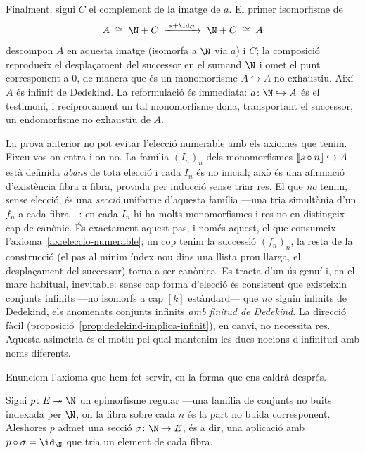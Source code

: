 \begin{prova}
Finalment, sigui \(C\) el complement de la imatge de \(a\). El primer
isomorfisme de
\[
A\;\cong\;\N + C\;\xrightarrow{\;s+\id_C\;}\;\N+C\;\cong\;A
\]
descompon \(A\) en aquesta imatge (isomorfa a \(\N\) via \(a\)) i \(C\); la
composició reprodueix el desplaçament del successor en el sumand \(\N\) i
omet el punt corresponent a \(0\), de manera que és un monomorfisme
\(A\hookrightarrow A\) no exhaustiu. Així \(A\) és infinit de Dedekind. La
reformulació és immediata: \(a\colon\N\hookrightarrow A\) és el testimoni, i
recíprocament un tal monomorfisme dona, transportant el successor, un
endomorfisme no exhaustiu de \(A\).
\end{prova}

\begin{observacio}\label{obs:necessitat-eleccio-dedekind}
La prova anterior no pot evitar l'elecció numerable amb els axiomes que
tenim. Fixeu-vos on entra i on no. La família \((I_n)_n\) dels monomorfismes
\(\llbracket s\circ n\rrbracket\hookrightarrow A\) està definida \emph{abans} de tota
elecció i cada \(I_n\) és no inicial; això és una afirmació d'existència
fibra a fibra, provada per inducció sense triar res. El que \emph{no}
tenim, sense elecció, és una \emph{secció} uniforme d'aquesta família ---una
tria simultània d'un \(f_n\) a cada fibra---: en cada \(I_n\) hi ha molts
monomorfismes i res no en distingeix cap de canònic. És exactament aquest
pas, i només aquest, el que consumeix l'axioma~\ref{ax:eleccio-numerable};
un cop tenim la successió \((f_n)_n\), la resta de la construcció (el pas al
mínim índex nou dins una llista prou llarga, el desplaçament del
successor) torna a ser canònica. Es
tracta d'un ús genuí i, en el marc habitual, inevitable: sense cap forma
d'elecció és consistent que existeixin conjunts infinits ---no isomorfs a
cap \([k]\) estàndard--- que \emph{no} siguin infinits de Dedekind, els
anomenats conjunts infinits \emph{amb finitud de Dedekind}. La direcció
fàcil (proposició~\ref{prop:dedekind-implica-infinit}), en canvi, no
necessita res. Aquesta asimetria és el motiu pel qual mantenim les dues
nocions d'infinitud amb noms diferents.
\end{observacio}

Enunciem l'axioma que hem fet servir, en la forma que ens caldrà després.

\begin{axioma}\label{ax:eleccio-numerable}
Sigui \(p\colon E\twoheadrightarrow\N\) un epimorfisme regular ---una
família de conjunts no buits indexada per \(\N\), on la fibra sobre cada
\(n\) és la part no buida corresponent. Aleshores \(p\) admet una secció
\(\sigma\colon\N\to E\), és a dir, una aplicació amb \(p\circ\sigma=\id_\N\)
que tria un element de cada fibra.
\end{axioma}


